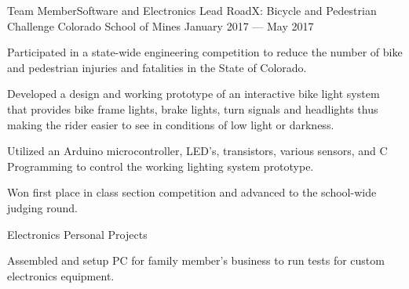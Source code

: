 \begin{cventries}

  \cventry
    {Team Member{\enskip\cdotp\enskip}Software and Electronics Lead} %
    {RoadX\@: Bicycle and Pedestrian Challenge} %
    {Colorado School of Mines} %
    {January 2017 --- May 2017} %
    {
      \begin{cvitems} %
        \item {Participated in a state-wide engineering competition to reduce the number of bike and pedestrian injuries and fatalities in the State of Colorado.}
        \item {Developed a design and working prototype of an interactive bike light system that provides bike frame lights, brake lights, turn signals and headlights thus making the rider easier to see in conditions of low light or darkness.}
        \item {Utilized an Arduino microcontroller, LED's, transistors, various sensors, and C Programming to control the working lighting system prototype.}
        \item {Won first place in class section competition and advanced to the school-wide judging round.}
      \end{cvitems}
    }

  \cventry
    {Electronics} %
    {Personal Projects} %
    {} %
    {} %
    {
      \begin{cvitems} %
        \item {Assembled and setup PC for family member's business to run tests for custom electronics equipment.}
        \end{cvitems}
   }


\end{cventries}
